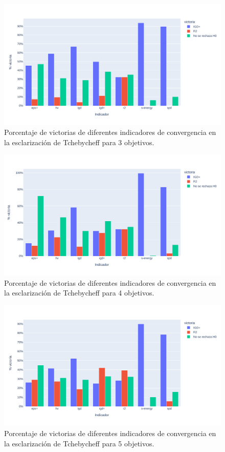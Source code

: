 \begin{figure} [H]
    \centering
\includegraphics[width=\textwidth]{Figuras/R2_vs_IGDp_nobj3.pdf}
\caption[IGD+ vs R2 3 objetivos]{Porcentaje de victorias de diferentes indicadores de convergencia en la esclarización de Tchebycheff para 3 objetivos.}
\label{fig:R2_vs_IGDp_3}
\end{figure}

\begin{figure} [H]
    \centering
\includegraphics[width=\textwidth]{Figuras/R2_vs_IGDp_nobj4.pdf}
\caption[IGD+ vs R2 4 objetivos]{Porcentaje de victorias de diferentes indicadores de convergencia en la esclarización de Tchebycheff para 4 objetivos.}
\label{fig:R2_vs_IGDp_4}
\end{figure}

\begin{figure} [H]
    \centering
\includegraphics[width=\textwidth]{Figuras/R2_vs_IGDp_nobj5.pdf}
\caption[IGD+ vs R2 5 objetivos]{Porcentaje de victorias de diferentes indicadores de convergencia en la esclarización de Tchebycheff para 5 objetivos.}
\label{fig:R2_vs_IGDp_5}
\end{figure}

